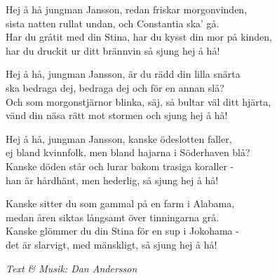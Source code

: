 \vspace{10pt}
Hej å hå jungman Jansson, redan friskar morgonvinden,\\
sista natten rullat undan, och Constantia ska' gå.\\
Har du gråtit med din Stina, har du kysst din mor på kinden,\\
har du druckit ur ditt brännvin så sjung hej å hå!\par
\vspace{10pt}
Hej å hå, jungman Jansson, är du rädd din lilla snärta\\
ska bedraga dej, bedraga dej och för en annan slå?\\
Och som morgonstjärnor blinka, säj, så bultar väl ditt hjärta,\\
vänd din näsa rätt mot stormen och sjung hej å hå!\par
\vspace{10pt}
Hej å hå, jungman Jansson, kanske ödeslotten faller,\\
ej bland kvinnfolk, men bland hajarna i Söderhaven blå?\\
Kanske döden står och lurar bakom trasiga koraller -\\
han är hårdhänt, men hederlig, så sjung hej å hå!\par
\vspace{10pt}
Kanske sitter du som gammal på en farm i Alabama,\\
medan åren siktas långsamt över tinningarna grå.\\
Kanske glömmer du din Stina för en sup i Jokohama -\\
det är slarvigt, med mänskligt, så sjung hej å hå!
\par
\vspace{10pt}
{\footnotesize\textit{Text \& Musik: Dan Andersson}}
